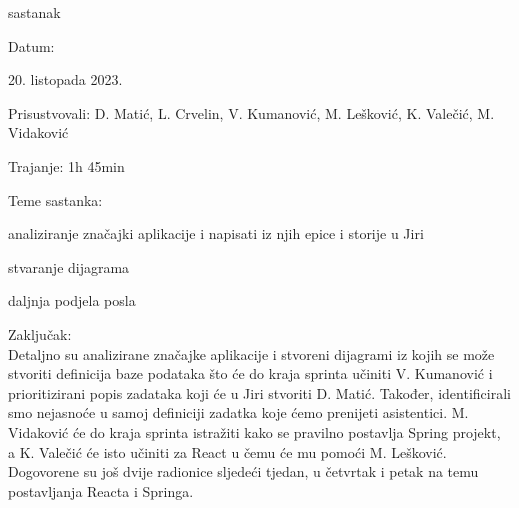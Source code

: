 \begin{packed_enum}
   
			\item  sastanak
			\item[] \begin{packed_item}
				\item Datum: \date[{20. listopada 2023.}
				\item Prisustvovali:  D. Matić, L. Crvelin, V. Kumanović, M. Lešković, K. Valečić, M. Vidaković
				\item Trajanje: 1h 45min
				\item Teme sastanka:
				\begin{packed_item}
					\item  analiziranje značajki aplikacije i napisati iz njih epice i storije u Jiri
					\item  stvaranje dijagrama
                    \item  daljnja podjela posla
				\end{packed_item}
            \item Zaključak: \\Detaljno su analizirane značajke aplikacije i stvoreni dijagrami iz kojih se može stvoriti definicija baze podataka što će do kraja sprinta učiniti V. Kumanović i prioritizirani popis zadataka koji će u Jiri stvoriti D. Matić. Također, identificirali smo nejasnoće u samoj definiciji zadatka koje ćemo prenijeti asistentici.
            M. Vidaković će do kraja sprinta istražiti kako se pravilno postavlja Spring projekt, a K. Valečić će isto učiniti za React u čemu će mu pomoći M. Lešković. \\
            Dogovorene su još dvije radionice sljedeći tjedan, u četvrtak i petak na temu postavljanja Reacta i Springa.
			\end{packed_item}



\end{packed_enum}
